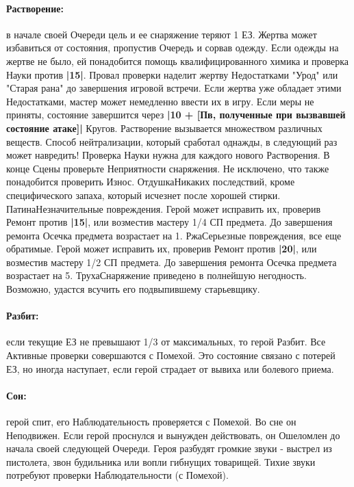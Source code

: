 \paragraph{Растворение:} в начале своей Очереди цель и ее снаряжение теряют 1 ЕЗ. Жертва может избавиться от состояния, пропустив Очередь и сорвав одежду. Если одежды на жертве не было, ей понадобится помощь квалифицированного химика и проверка Науки против \textbf{|15|}. Провал проверки наделит жертву Недостатками "Урод" или "Старая рана" до завершения игровой встречи. Если жертва уже обладает этими Недостатками, мастер может немедленно ввести их в игру.
\newline Если меры не приняты, состояние завершится через \textbf{|10 + [Пв, полученные при вызвавшей состояние атаке]|} Кругов.
\newline Растворение вызывается множеством различных веществ. Способ нейтрализации, который сработал однажды, в следующий раз может навредить! Проверка Науки нужна для каждого нового Растворения.
\newline В конце Сцены проверьте Неприятности снаряжения. Не исключено, что также понадобится проверить Износ.
\trouble
{Отдушка}{Никаких последствий, кроме специфического запаха, который исчезнет после хорошей стирки.}
{Патина}{Незначительные повреждения. Герой может исправить их, проверив Ремонт против \textbf{|15|}, или возместив мастеру 1/4 СП предмета. До завершения ремонта Осечка предмета возрастает на 1.}
{Ржа}{Серьезные повреждения, все еще обратимые. Герой может исправить их, проверив Ремонт против \textbf{|20|}, или возместив мастеру 1/2 СП предмета. До завершения ремонта Осечка предмета возрастает на 5.}
{Труха}{Снаряжение приведено в полнейшую негодность. Возможно, удастся всучить его подвыпившему старьевщику.}
\paragraph{Разбит:} если текущие ЕЗ не превышают 1/3 от максимальных, то герой Разбит. Все Активные проверки совершаются с Помехой. 
\newline Это состояние связано с потерей ЕЗ, но иногда наступает, если герой страдает от вывиха или болевого приема. 
\paragraph{Сон:} герой спит, его Наблюдательность проверяется с Помехой. Во сне он Неподвижен. Если герой проснулся и вынужден действовать, он Ошеломлен до начала своей следующей Очереди. 
\newline Героя разбудят громкие звуки - выстрел из пистолета, звон будильника или вопли гибнущих товарищей. Тихие звуки потребуют проверки Наблюдательности (с Помехой).

